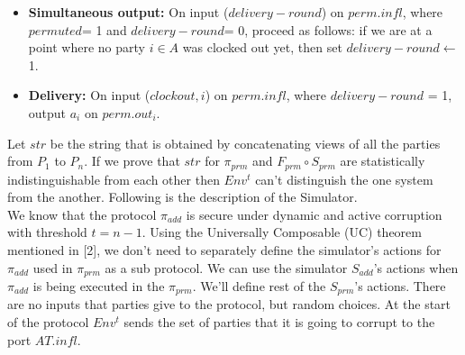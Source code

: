 \documentclass{llncs}
\begin{document}
\begin{framed}
\begin{itemize}
\item \textbf{Simultaneous output:} On input ($delivery-round$) on $perm.infl$, where $permuted$= 1 and $delivery-round$= 0, proceed as follows: if we are at a point where no party $i \in A$ was clocked out yet, then set $delivery-round\leftarrow$ 1.

\item \textbf{Delivery:} On input ($clockout, i$) on $perm.infl$, where $delivery-round$ = 1, output $a_i$ on $perm.out_i$.
\end{itemize}
\end{framed}

Let $str$ be the string that is obtained by concatenating views of all the parties from $P_1$ to $P_n$. If we prove that $str$ for $ \pi_{prm} $ and $ F_{prm} \circ S_{prm} $ are statistically indistinguishable from each other then $Env^t$ can't distinguish the one system from the another. Following is the description of the Simulator.\\
We know that the protocol $ \pi_{add} $ is secure under dynamic and active corruption with threshold $t=n-1$. Using the Universally Composable (UC) theorem mentioned in [2], we don't need to separately define the simulator's actions for $ \pi_{add} $ used in $ \pi_{prm} $ as a sub protocol. We can use the simulator $ S_{add} $'s actions when $\pi_{add}$ is being executed in the $\pi_{prm}$. We'll define rest of the $S_{prm}$'s actions. There are no inputs that parties give to the protocol, but random choices. At the start of the protocol $Env^t$ sends the set of parties that it is going to corrupt to the port $AT.infl$. \\
\end{document}
